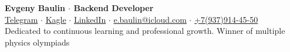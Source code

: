 \begin{center}
    \LARGE\textbf{Evgeny Baulin $\cdot$ Backend Developer \textit{}}\\
    \normalsize\href{https://t.me/tarakan_tuc}{Telegram} $\cdot$
    \normalsize\href{https://www.kaggle.com/evgeny1928}{Kagle} $\cdot$
    \normalsize\href{https://www.linkedin.com/in/evgeny-baulin/}{LinkedIn} $\cdot$ \href{mailto:e.baulin@icloud.com}{e.baulin@icloud.com} $\cdot$ \href{tel:+79379144550}{+7(937)914-45-50}\\
    Dedicated to continuous learning and professional growth. Winner of multiple physics olympiads\\
    \hrulefill
\end{center}